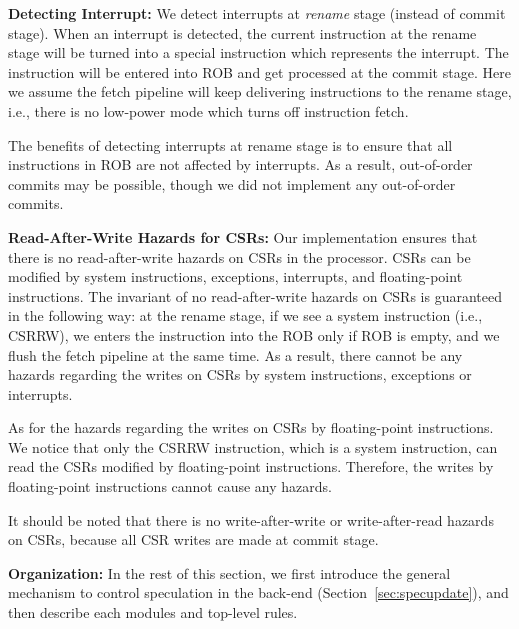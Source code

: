 \documentclass[12pt]{article}
\newcommand{\inst}[1]{\textsf{#1}}
\begin{document}
\noindent\textbf{Detecting Interrupt:}
We detect interrupts at \emph{rename} stage (instead of commit stage).
When an interrupt is detected, the current instruction at the rename stage will be turned into a special instruction which represents the interrupt.
The instruction will be entered into ROB and get processed at the commit stage.
Here we assume the fetch pipeline will keep delivering instructions to the rename stage, i.e., there is no low-power mode which turns off instruction fetch.

The benefits of detecting interrupts at rename stage is to ensure that all instructions in ROB are not affected by interrupts.
As a result, out-of-order commits may be possible, though we did not implement any out-of-order commits.

\noindent\textbf{Read-After-Write Hazards for CSRs:}
Our implementation ensures that there is no read-after-write hazards on CSRs in the processor.
CSRs can be modified by system instructions, exceptions, interrupts, and floating-point instructions.
The invariant of no read-after-write hazards on CSRs is guaranteed in the following way: at the rename stage, if we see a system instruction (i.e., \inst{CSRRW}), we enters the instruction into the ROB only if ROB is empty, and we flush the fetch pipeline at the same time.
As a result, there cannot be any hazards regarding the writes on CSRs by system instructions, exceptions or interrupts.

As for the hazards regarding the writes on CSRs by floating-point instructions.
We notice that only the \inst{CSRRW} instruction, which is a system instruction, can read the CSRs modified by floating-point instructions.
Therefore, the writes by floating-point instructions cannot cause any hazards.

It should be noted that there is no write-after-write or write-after-read hazards on CSRs, because all CSR writes are made at commit stage.

\noindent\textbf{Organization:}
In the rest of this section, we first introduce the general mechanism to control speculation in the back-end (Section~\ref{sec:specupdate}), and then describe each modules and top-level rules.












\end{document}
